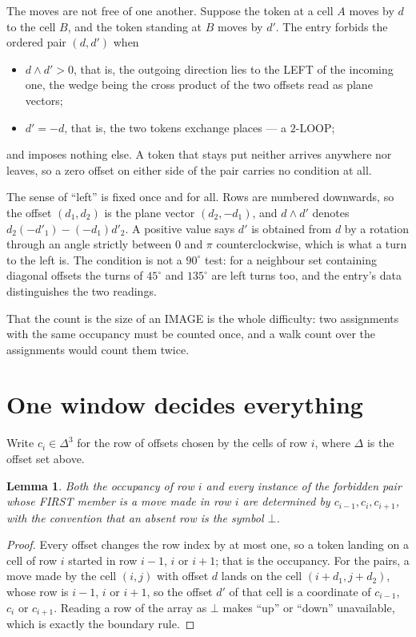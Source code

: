 \documentclass[11pt,a4paper]{article}
\theoremstyle{plain}
\newtheorem{lemma}[theorem]{Lemma}
\theoremstyle{definition}
\begin{document}
The moves are not free of one another. Suppose the token at a cell $A$ moves by $d$ to the
cell $B$, and the token standing at $B$ moves by $d'$. The entry forbids the ordered pair
$(d,d')$ when
\begin{itemize}
\item $d\wedge d'>0$, that is, the outgoing direction lies to the LEFT of the incoming one, the wedge being the cross product of the two offsets read as plane vectors;
\item $d'=-d$, that is, the two tokens exchange places --- a $2$-LOOP;
\end{itemize}
and imposes nothing else. A token that stays put neither arrives anywhere nor leaves, so a
zero offset on either side of the pair carries no condition at all.

The sense of ``left'' is fixed once and for all. Rows are numbered downwards, so the offset
$(d_1,d_2)$ is the plane vector $(d_2,-d_1)$, and $d\wedge d'$ denotes
$d_2(-d'_1)-(-d_1)d'_2$. A positive value says $d'$ is obtained from $d$ by a rotation through
an angle strictly between $0$ and $\pi$ counterclockwise, which is what a turn to the left is.
The condition is not a $90^\circ$ test: for a neighbour set containing diagonal offsets the
turns of $45^\circ$ and $135^\circ$ are left turns too, and the entry's data distinguishes the
two readings.

That the count is the size of an IMAGE is the whole difficulty: two assignments with the same
occupancy must be counted once, and a walk count over the assignments would count them twice.

\section{One window decides everything}

Write $c_i\in\Delta^{3}$ for the row of offsets chosen by the cells of row $i$, where
$\Delta$ is the offset set above.

\begin{lemma}\label{lem:win}
Both the occupancy of row $i$ and every instance of the forbidden pair whose FIRST member is a
move made in row $i$ are determined by $c_{i-1},c_i,c_{i+1}$, with the convention that an
absent row is the symbol $\bot$.
\end{lemma}

\begin{proof}
Every offset changes the row index by at most one, so a token landing on a cell of row $i$
started in row $i-1$, $i$ or $i+1$; that is the occupancy. For the pairs, a move made by the
cell $(i,j)$ with offset $d$ lands on the cell $(i+d_1,j+d_2)$, whose row is $i-1$, $i$ or
$i+1$, so the offset $d'$ of that cell is a coordinate of $c_{i-1}$, $c_i$ or $c_{i+1}$.
Reading a row of the array as $\bot$ makes ``up'' or ``down'' unavailable, which is exactly
the boundary rule.
\end{proof}
\end{document}
